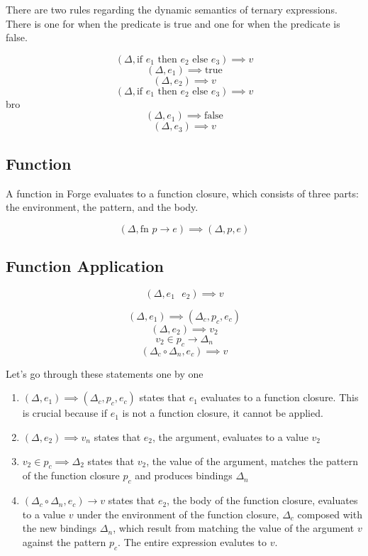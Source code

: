 \documentclass[titlepage]{article}
\begin{document}
There are two rules regarding the dynamic semantics of ternary expressions. There is one for when the predicate is true and one for when the predicate is false.


$$(\Delta, \text{if } e_1 \text{ then } e_2 \text{ else } e_3) \implies v$$
\noindent\makebox[\linewidth]{\rule{2.2in}{0.4pt}}
$$(\Delta, e_1) \implies \text{true}$$
$$(\Delta, e_2) \implies v$$
\noindent\makebox[\linewidth]{\rule{3in}{0.4pt}}
$$(\Delta, \text{if } e_1 \text{ then } e_2 \text{ else } e_3) \implies v$$
\noindent\makebox[\linewidth]{\rule{2.2in}{0.4pt}}bro
$$(\Delta, e_1) \implies \text{false}$$
$$(\Delta, e_3) \implies v$$

\subsection{Function}

A function in Forge evaluates to a function closure, which consists of three parts: the environment, the pattern, and the body.

$$(\Delta, \text{fn } p \rightarrow e) \implies (\Delta, p, e)$$

\subsection{Function Application}

$$(\Delta, e_1 \text{ } e_2) \implies v$$
\noindent\makebox[\linewidth]{\rule{1.2in}{0.4pt}}

$$(\Delta, e_1) \implies (\Delta_c, p_c, e_c)$$
$$(\Delta, e_2) \implies v_2$$
$$v_2 \in p_c \rightarrow \Delta_n$$
$$(\Delta_c \circ \Delta_n, e_c) \implies v$$

Let's go through these statements one by one

\begin{enumerate}
\item $(\Delta, e_1) \implies (\Delta_c, p_c, e_c)$ states that $e_1$ evaluates to a function closure. This is crucial because if $e_1$ is not a function closure, it cannot be applied.
\item $(\Delta, e_2) \implies v_n$ states that $e_2$, the argument, evaluates to a value $v_2$
\item $v_2 \in p_c \implies \Delta_2$ states that $v_2$, the value of the argument, matches the pattern of the function closure $p_c$ and produces bindings $\Delta_n$
\item $(\Delta_c \circ \Delta_n, e_c) \rightarrow v$ states that $e_2$, the body of the function closure, evaluates to a value $v$ under the environment of the function closure, $\Delta_c$ composed with the new bindings $\Delta_n$, which result from matching the value of the argument $v$ against the pattern $p_c$. The entire expression evalutes to $v$.

\end{enumerate}
\end{document}
